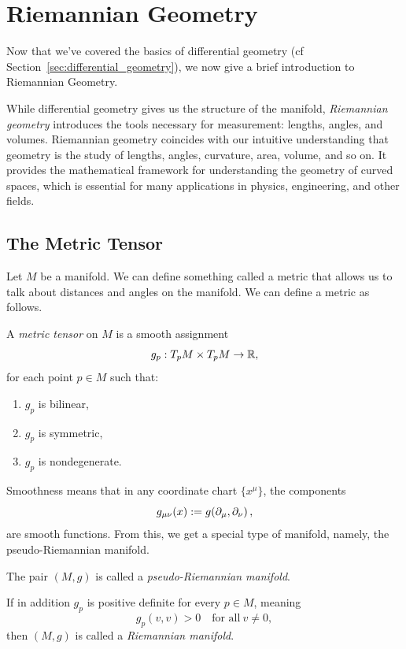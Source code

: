 \section{Riemannian Geometry}
\label{sec:riemannian_geometry}

Now that we've covered the basics of differential geometry (cf Section~\ref{sec:differential_geometry}), we now give a brief introduction to Riemannian Geometry.

While differential geometry gives us the structure of the manifold, \emph{Riemannian geometry} introduces the tools necessary for measurement: lengths, angles, and volumes. Riemannian geometry coincides with our intuitive understanding that geometry is the study of lengths, angles, curvature, area, volume, and so on. It provides the mathematical framework for understanding the geometry of curved spaces, which is essential for many applications in physics, engineering, and other fields.

\subsection{The Metric Tensor} Let $M$ be a manifold. We can define something called a metric that allows us to talk about distances and angles on the manifold. We can define a metric as follows.

\begin{definition}
  A \emph{metric tensor} on $M$ is a smooth assignment
  \[%
    g_p : T_pM \times T_pM \to \R
  ,\]%
  for each point $p \in M$ such that:
  \begin{enumerate}
    \item $g_p$ is bilinear,
    \item $g_p$ is symmetric,
    \item $g_p$ is nondegenerate.
  \end{enumerate}
\end{definition}

Smoothness means that in any coordinate chart $\{x^\mu\}$, the components
\[%
  g_{\mu\nu}(x) := g\!\left(\pd{\mu}, \pd{\nu}\right)
,\]%
are smooth functions. From this, we get a special type of manifold, namely, the pseudo-Riemannian manifold.

\begin{definition}
  The pair $(M, g)$ is called a \emph{pseudo-Riemannian manifold}.

  If in addition $g_p$ is positive definite for every $p \in M$, meaning
  \[%
    g_p(v,v) > 0 \quad \text{for all}~v \neq 0
  ,\]%
  then $(M, g)$ is called a \emph{Riemannian manifold}.
\end{definition}

